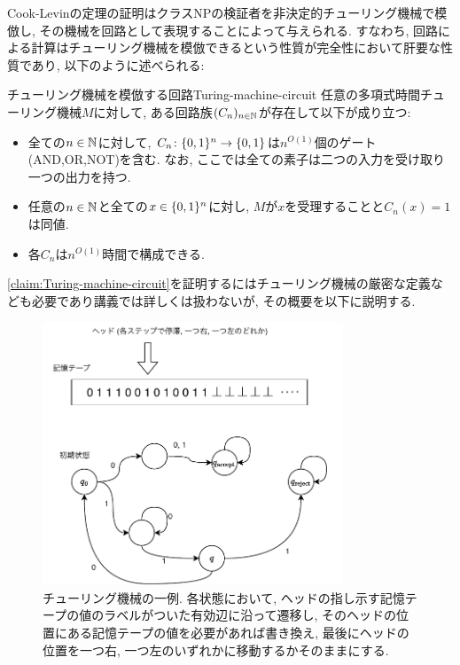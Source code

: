 

Cook-Levinの定理の証明はクラスNPの検証者を非決定的チューリング機械で模倣し, その機械を回路として表現することによって与えられる.
すなわち, 回路による計算はチューリング機械を模倣できるという性質が完全性において肝要な性質であり, 以下のように述べられる:
\begin{claim}{チューリング機械を模倣する回路}{Turing-machine-circuit}
  任意の多項式時間チューリング機械$M$に対して, ある回路族$(C_n)_{n\in\mathbb{N}}$が存在して以下が成り立つ:
  \begin{itemize}
    \item 全ての$n\in\mathbb{N}$に対して, $C_n\colon\{0,1\}^n\to\{0,1\}$は$n^{O(1)}$個のゲート(AND,OR,NOT)を含む. なお, ここでは全ての素子は二つの入力を受け取り一つの出力を持つ.
    \item 任意の$n\in\mathbb{N}$と全ての$x\in\{0,1\}^n$に対し, $M$が$x$を受理することと$C_n(x)=1$は同値.
    \item 各$C_n$は$n^{O(1)}$時間で構成できる.
  \end{itemize}
\end{claim}
\cref{claim:Turing-machine-circuit}を証明するにはチューリング機械の厳密な定義なども必要であり講義では詳しくは扱わないが, その概要を以下に説明する.

\begin{figure}[ht]
  \centering
  \includegraphics[width=0.8\textwidth]{images/Turing.pdf}
  \caption{チューリング機械の一例. 各状態において, ヘッドの指し示す記憶テープの値のラベルがついた有効辺に沿って遷移し, そのヘッドの位置にある記憶テープの値を必要があれば書き換え, 最後にヘッドの位置を一つ右, 一つ左のいずれかに移動するかそのままにする. \label{fig:Turing-machine}}
\end{figure}

